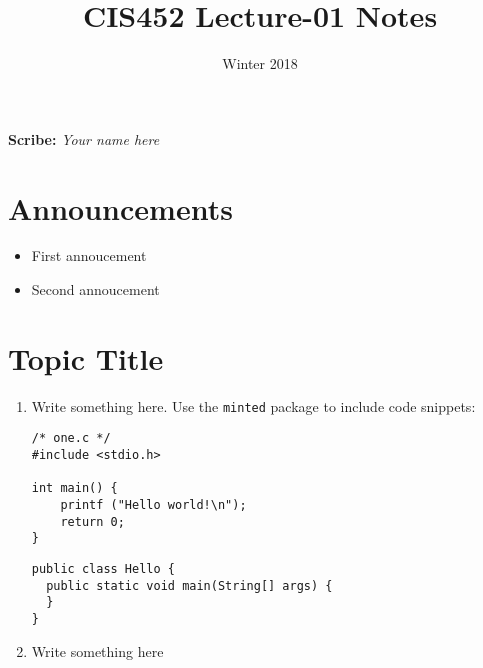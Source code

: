 \documentclass[11pt]{article}
\title{CIS452 Lecture-01 Notes}
\author{Winter 2018}
\date{}
\begin{document}
\maketitle

\noindent

\textbf{Scribe:} \textit{Your name here}

\section*{Announcements}

\begin{itemize}
  \item First annoucement
  \item Second annoucement
\end{itemize}

\section*{Topic Title}


\begin{enumerate}
\item Write something here. Use the \verb|minted| package to include code 
snippets:

\begin{verbatim}
/* one.c */
#include <stdio.h>

int main() {
    printf ("Hello world!\n");
    return 0;
}
\end{verbatim}

\begin{verbatim}
public class Hello { 
  public static void main(String[] args) {
  }
}
\end{verbatim}

\item Write something here
\end{enumerate}
\end{document}
